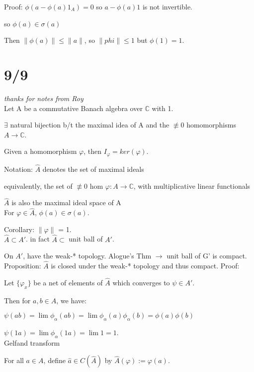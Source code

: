 \documentclass[12pt]{article}
\begin{document}
Proof: $\phi(a - \phi(a)1_A) = 0$ so $a - \phi(a)1$ is not invertible.

so $\phi(a) \in \sigma(a)$

Then $\|\phi(a)\| \leq \|a\|$, so $\|phi\| \leq 1$ but $\phi(1) = 1$.

\section{9/9}

\noindent
\textit{thanks for notes from Roy}\\

\noindent
Let A be a commutative Banach algebra over $\mathds{C}$ with 1.

$\exists$ natural bijection b/t the maximal idea of A and the $\not \equiv 0$ homomorphisms $A \to \mathds{C}$.  

Given a homomorphism $\varphi$, then $I_\varphi = ker(\varphi)$.

\noindent
Notation: $\hat{A}$ denotes the set of maximal ideals

equivalently, the set of $\not \equiv 0$ hom $\varphi: A \to \mathds{C}$, with multiplicative linear functionals

$\hat{A}$ is also the maximal ideal space of A\\

\noindent
For $\varphi \in \hat{A}$, $\phi(a) \in \sigma(a)$.

Corollary: $\|\varphi\|$ = 1.\\

\noindent
$\hat{A} \subset A'$.  in fact $\hat{A} \subset$ unit ball of $A'$.

On $A'$, have the weak-* topology.  Alogue's Thm $\to$ unit ball of G' is compact.\\

\noindent
Proposition: $\hat{A}$ is closed under the weak-* topology and thus compact.
\noindent
Proof:

Let $\{\varphi_x\}$ be a net of elements of $\hat{A}$ which converges to $\psi \in A'$.

Then for $a, b \in A$, we have:

$\psi(ab) = \lim \phi_\alpha(ab) = \lim \phi_\alpha(a)\phi_\alpha(b) = \phi(a)\phi(b)$

$\psi(1a) = \lim \phi_\alpha(1a) = \lim 1 = 1$.\\

\noindent
Gelfand transform

For all $a \in A$, define $\hat{a} \in C(\hat{A})$ by $\hat{A}(\varphi) := \varphi(a)$.
\end{document}
